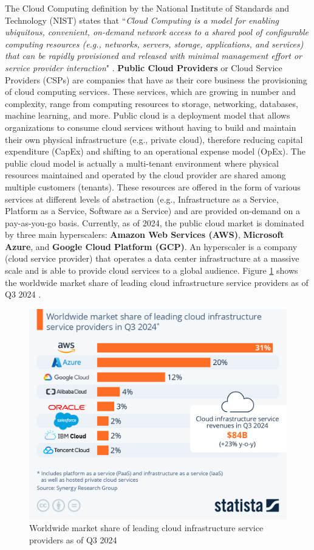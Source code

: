 The Cloud Computing definition by the National Institute of Standards and Technology (NIST) \cite{nist} states that ``\textit{Cloud Computing is a model for enabling ubiquitous, convenient, on-demand network access to a shared pool of configurable computing resources (e.g., networks, servers, storage, applications, and services) that can be rapidly provisioned and released with minimal management effort or service provider interaction}" \cite{nist}.
\textbf{Public Cloud Providers} or Cloud Service Providers (CSPs) are companies that have as their core business the provisioning of cloud computing services. 
These services, which are growing in number and complexity, range from computing resources to storage, networking, databases, machine learning, and more. 
Public cloud is a deployment model that allows organizations to consume cloud services without having to build and maintain their own physical infrastructure (e.g., private cloud), therefore reducing capital expenditure (CapEx) and shifting to an operational expense model (OpEx). 
The public cloud model is actually a multi-tenant environment where physical resources maintained and operated by the cloud provider are shared among multiple customers (tenants).
These resources are offered in the form of various services at different levels of abstraction (e.g., Infrastructure as a Service, Platform as a Service, Software as a Service) and are provided on-demand on a pay-as-you-go basis.
Currently, as of 2024, the public cloud market is dominated by three main hyperscalers: \textbf{Amazon Web Services (AWS)}, \textbf{Microsoft Azure}, and \textbf{Google Cloud Platform (GCP)}.
An hyperscaler is a company (cloud service provider) that operates a data center infrastructure at a massive scale and is able to provide cloud services to a global audience.
Figure \ref{fig:pcp} shows the worldwide market share of leading cloud infrastructure service providers as of Q3 2024 \cite{statista}.

\begin{figure}[htb]
    \centering
    \includegraphics[width=0.75\linewidth]{images/pcp.jpeg}
    \caption{Worldwide market share of leading cloud infrastructure service providers as of Q3 2024 \cite{statista}}
    \label{fig:pcp}
\end{figure}
  
